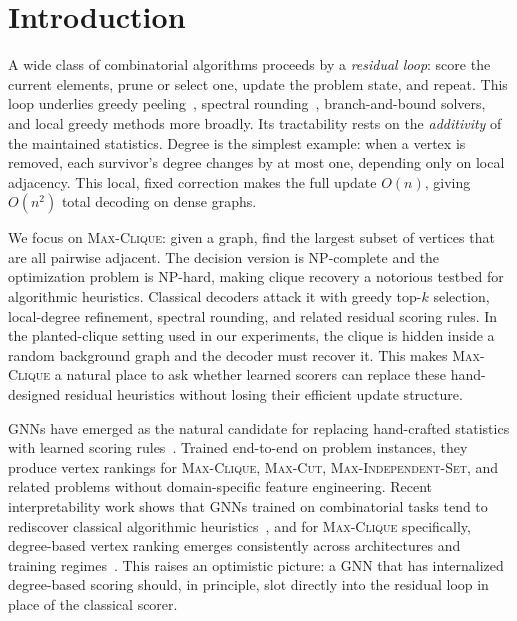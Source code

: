 \documentclass[journal,article,submit,pdftex,moreauthors]{Definitions/mdpi}
\begin{document}
\maketitle

\section{Introduction}

A wide class of combinatorial algorithms proceeds by a \emph{residual loop}: score
the current elements, prune or select one, update the problem state, and repeat.
This loop underlies greedy peeling~\citep{feige2010}, spectral
rounding~\citep{alon1998}, branch-and-bound solvers, and local greedy methods more
broadly. Its tractability rests on the \emph{additivity} of the maintained
statistics. Degree is the simplest example: when a vertex is removed, each
survivor's degree changes by at most one, depending only on local adjacency. This
local, fixed correction makes the full update $O(n)$, giving $O(n^2)$ total
decoding on dense graphs.


We focus on \textsc{Max-Clique}: given a graph, find the largest subset of vertices
that are all pairwise adjacent. The decision version is NP-complete and the
optimization problem is NP-hard, making clique recovery a notorious testbed for
algorithmic heuristics. Classical decoders attack it with greedy top-$k$ selection,
local-degree refinement, spectral rounding, and related residual scoring rules. In
the planted-clique setting used in our experiments, the clique is hidden inside a
random background graph and the decoder must recover it. This makes
\textsc{Max-Clique} a natural place to ask whether learned scorers can replace these
hand-designed residual heuristics without losing their efficient update structure.


GNNs have emerged as the natural candidate for replacing hand-crafted statistics
with learned scoring rules~\citep{karalias2020,min2022,garmendia2024}. Trained
end-to-end on problem instances, they produce vertex rankings for \textsc{Max-Clique},
\textsc{Max-Cut}, \textsc{Max-Independent-Set}, and related problems without
domain-specific feature engineering. Recent interpretability work shows that GNNs
trained on combinatorial tasks tend to rediscover classical algorithmic
heuristics~\citep{cappart2023}, and for \textsc{Max-Clique} specifically,
degree-based vertex ranking emerges consistently across architectures and training
regimes~\citep{shoham2026ltr}. This raises an optimistic picture: a GNN that has
internalized degree-based scoring should, in principle, slot directly into the
residual loop in place of the classical scorer.
\end{document}
